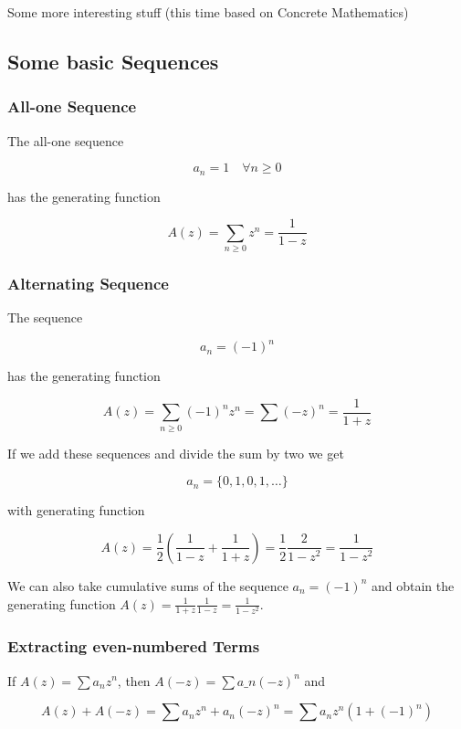 

Some more interesting stuff (this time based on Concrete Mathematics)

\subsection{Some basic Sequences}\label{some-basic-sequences}

\subsubsection{All-one Sequence}\label{all-one-sequence}

The all-one sequence

\[a_n = 1 \quad \forall n \geq 0\]

has the generating function

\[A(z) = \sum_{n \geq 0} z^n = \frac{1}{1-z}\]

\subsubsection{Alternating Sequence}\label{alternating-sequence}

The sequence

\[ a_n = (-1)^n \]

has the generating function

\[ A(z) = \sum_{n \geq 0} (-1)^n z^n = \sum (-z)^n = \frac{1}{1+z}\]

If we add these sequences and divide the sum by two we get

\[ a_n = \{0, 1, 0, 1, \ldots\} \]

with generating function

\[ A(z) = \frac{1}{2} \left( \frac{1}{1-z} + \frac{1}{1+z}\right) = \frac{1}{2} \frac{2}{1-z^2} = \frac{1}{1-z^2} \]

We can also take cumulative sums of the sequence $a_n = (-1)^n$ and obtain the generating function $A(z) = \frac{1}{1+z} \frac{1}{1-z} = \frac{1}{1-z^2}$.

\subsubsection{Extracting even-numbered
Terms}\label{extracting-even-numbered-terms}

If $A(z) = \sum a_n z^n$, then $A(-z) = \sum a\_n (-z)^n$ and

\[A(z) + A(-z) = \sum a_n z^n  + a_n (-z)^n = \sum a_n z^n (1 + (-1)^n)\]

